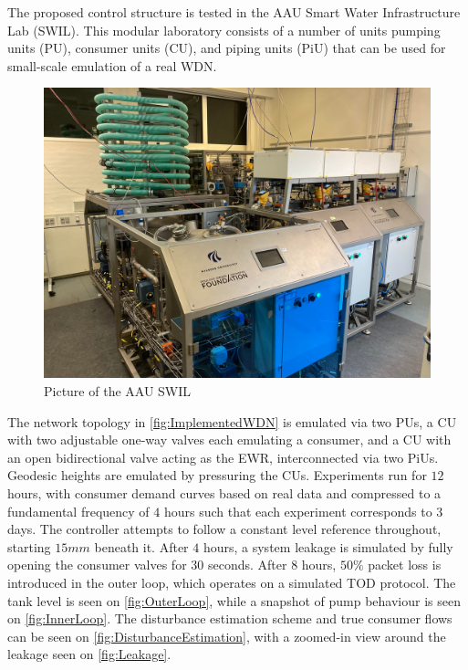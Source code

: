 The proposed control structure is tested in the AAU Smart Water Infrastructure Lab (SWIL). This modular laboratory consists of a number of units pumping units (PU), consumer units (CU), and piping units (PiU) that can be used for small-scale emulation of a real WDN.

\begin{figure}[h!]
	\includegraphics[width=\linewidth]{Pictures/SWIL.pdf}
	\caption{Picture of the AAU SWIL}
	\label{fig:AAUSWIL}
\end{figure}

The network topology in \cref{fig:ImplementedWDN} is emulated via two PUs, a CU with two adjustable one-way valves each emulating a consumer, and a CU with an open bidirectional valve acting as the EWR, interconnected via two PiUs. Geodesic heights are emulated by pressuring the CUs. Experiments run for $12$ hours, with consumer demand curves based on real data and compressed to a fundamental frequency of $4$ hours such that each experiment corresponds to $3$ days. The controller attempts to follow a constant level reference throughout, starting $15 \si{mm}$ beneath it. After $4$ hours, a system leakage is simulated by fully opening the consumer valves for $30$ seconds. After $8$ hours, $50\%$ packet loss is introduced in the outer loop, which operates on a simulated TOD protocol. The tank level is seen on \cref{fig:OuterLoop}, while a snapshot of pump behaviour is seen on \cref{fig:InnerLoop}. The disturbance estimation scheme and true consumer flows can be seen on \cref{fig:DisturbanceEstimation}, with a zoomed-in view around the leakage seen on \cref{fig:Leakage}.


